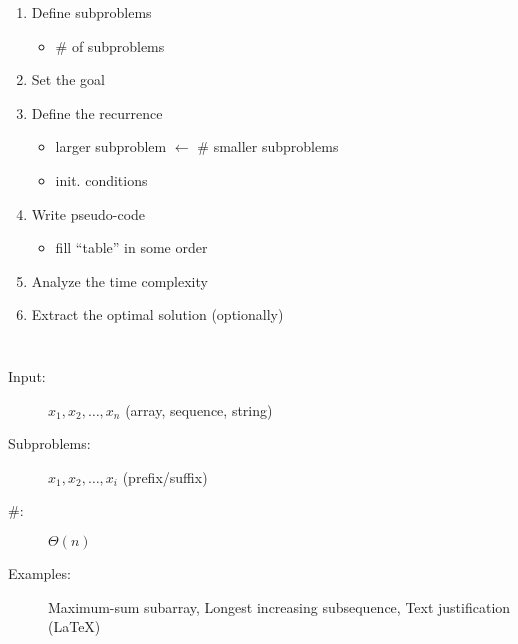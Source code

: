 
\begin{frame}{}
\end{frame}

\begin{frame}{}
  \centerline{}

  \pause
  \vspace{0.30cm}
  \begin{columns}
  \begin{enumerate}[(1)]
    \setlength{\itemsep}{8pt}
    \item Define subproblems
      \begin{itemize}
	\item \# of subproblems
      \end{itemize}
    \item Set the goal
    \item Define the recurrence
      \begin{itemize}
	\item larger subproblem $\gets$ \# smaller subproblems
	\item init. conditions
      \end{itemize}
      \pause
    \item Write pseudo-code
      \begin{itemize}
	\item fill ``table'' in some order
      \end{itemize}
    \item Analyze the time complexity
    \item Extract the optimal solution (optionally)
  \end{enumerate}
  \end{columns}
\end{frame}
\begin{frame}{}
  \centerline{}

  \vspace{0.50cm}
  \begin{description}
    \item[Input:] $x_1, x_2, \dots, x_n$ (array, sequence, string)
    \item[Subproblems:] $x_1, x_2, \dots, x_i$ (prefix/suffix)
    \item[\#:] $\Theta(n)$
    \item[Examples:] Maximum-sum subarray, Longest increasing subsequence, Text justification (\LaTeX)
  \end{description}
\end{frame}
